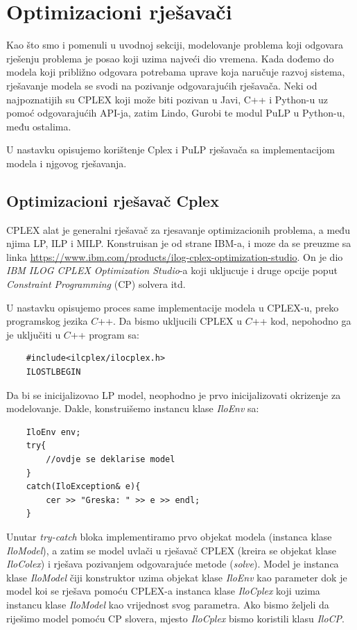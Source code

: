 \documentclass[a4paper, utf8, 11pt, colorlinks]{article}
\begin{document}
 \newpage 
 \section{Optimizacioni rješavači}
 
 Kao što smo i pomenuli u uvodnoj sekciji, modelovanje problema koji odgovara rješenju problema je 
 posao koji uzima najveći dio vremena. Kada dođemo do modela koji približno odgovara potrebama uprave 
 koja naručuje razvoj sistema, rješavanje modela se svodi na pozivanje odgovarajućih rješavača. Neki od najpoznatijih su 
 CPLEX koji može biti pozivan u Javi, C++ i Python-u uz pomoć odgovarajućih API-ja, zatim Lindo, Gurobi te modul PuLP u Python-u, među ostalima.  
 
 U nastavku opisujemo korištenje Cplex i PuLP rješavača sa implementacijom modela i njgovog rješavanja. 
 
 \subsection{Optimizacioni rješavač Cplex}
 CPLEX alat je generalni rješavač za rjesavanje optimizacionih problema, a među njima  LP, ILP i MILP. Konstruisan je od strane IBM-a, i moze da se preuzme sa linka \url{https://www.ibm.com/products/ilog-cplex-optimization-studio}. On je dio \emph{IBM ILOG CPLEX Optimization Studio}-a koji ukljucuje i druge opcije poput \emph{Constraint Programming} (CP) solvera itd.
 
 U nastavku opisujemo proces same implementacije modela u CPLEX-u, preko programskog jezika $C$++.
 Da bismo ukljucili CPLEX u $C$++ kod, nepohodno ga je uključiti u $C$++ program sa:
 \begin{verbatim}
 	#include<ilcplex/ilocplex.h>
 	ILOSTLBEGIN
 \end{verbatim}
 Da bi se inicijalizovao LP model, neophodno je prvo inicijalizovati okrizenje za modelovanje. Dakle, konstruišemo instancu klase \emph{IloEnv} sa: 
 \begin{verbatim}
 	IloEnv env;
 	try{
 		//ovdje se deklarise model
 	}
 	catch(IloException& e){
 		cer >> "Greska: " >> e >> endl;
 	}
 \end{verbatim}
 
 \noindent Unutar \emph{try-catch} bloka implementiramo prvo objekat modela (instanca klase \emph{IloModel}), a zatim se model uvlači u rješavač CPLEX (kreira se objekat klase \emph{IloColex}) i rješava pozivanjem odgovarajuće metode (\emph{solve}).
 Model je instanca klase \emph{IloModel} čiji konstruktor uzima objekat klase \emph{IloEnv} kao parameter dok je model koi se rješava pomoću CPLEX-a instanca klase \emph{IloCplex} koji uzima instancu klase \emph{IloModel} kao vrijednost svog parametra.  Ako bismo željeli da riješimo model pomoću CP slovera, mjesto \emph{IloCplex} bismo koristili klasu \emph{IloCP}. 
 
\end{document}

